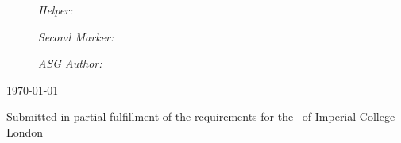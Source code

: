 \begin{title}
\begin{figure}[H]
	\begin{minipage}[t]{0.32 \linewidth}
 		\large\emph{Helper:} \\
		\helper
	\end{minipage}
	\begin{minipage}[t]{0.34 \linewidth}
	\centering
 		\large\emph{Second Marker:} \\
		\secondmarker
	\end{minipage}
	\begin{minipage}[t]{0.32 \linewidth}
	\begin{flushright}
 		\large\emph{ASG Author:} \\
		\asgauthor
	\end{flushright}
	\end{minipage}
\end{figure}






{\large \today} %


\vfill %
Submitted in partial fulfillment of the requirements for the \degreetype~of Imperial College London

\end{title}
